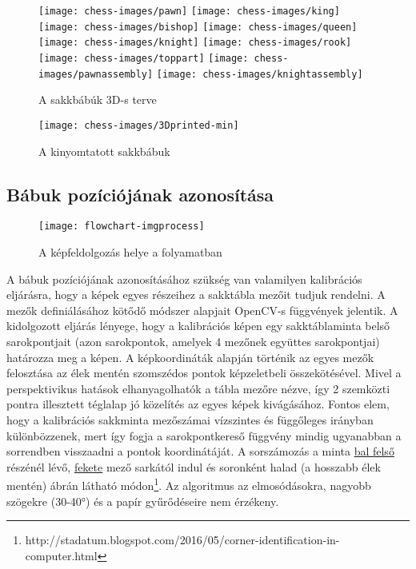 \documentclass[../documentation.tex]{subfiles}
\begin{document}
\begin{figure}[h]
\centering
\texttt{[image: chess-images/pawn]}
\texttt{[image: chess-images/king]}
\texttt{[image: chess-images/bishop]}
\texttt{[image: chess-images/queen]}
\texttt{[image: chess-images/knight]}
\texttt{[image: chess-images/rook]}
\texttt{[image: chess-images/toppart]}
\texttt{[image: chess-images/pawnassembly]}
\texttt{[image: chess-images/knightassembly]}
\caption{A sakkbábúk 3D-s terve}
\label{fig:chesspieces}
\end{figure}

\begin{figure}[h]
\centering
\texttt{[image: chess-images/3Dprinted-min]}
\caption{A kinyomtatott sakkbábuk}
\label{fig:3dprinted}
\end{figure}

\subsection{Bábuk pozíciójának azonosítása}

\begin{figure}[h]
\centering
\texttt{[image: flowchart-imgprocess]}
\caption{A képfeldolgozás helye a folyamatban}
\label{fig:flowchart-imgprocess}
\end{figure}

A bábuk pozíciójának azonosításához szükség van valamilyen kalibrációs eljárásra, hogy a képek egyes részeihez a sakktábla mezőit tudjuk rendelni. A mezők definiálásához kötődő módszer alapjait OpenCV-s függvények jelentik. A kidolgozott eljárás lényege, hogy a kalibrációs képen egy sakktáblaminta belső sarokpontjait (azon sarokpontok, amelyek 4 mezőnek együttes sarokpontjai) határozza meg a képen. A képkoordináták alapján történik az egyes mezők felosztása az élek mentén szomszédos pontok képzeletbeli összekötésével. Mivel a perspektivikus hatások elhanyagolhatók a tábla mezőre nézve, így 2 szemközti pontra illesztett téglalap jó közelítés az egyes képek kivágásához. Fontos elem, hogy a kalibrációs sakkminta mezőszámai vízszintes és függőleges irányban különbözzenek, mert így fogja a sarokpontkereső függvény mindig ugyanabban a sorrendben visszaadni a pontok koordinátáját. A sorszámozás a minta \underline{bal felső} részénél lévő, \underline{fekete} mező sarkától indul és soronként halad (a hosszabb élek mentén)  ábrán látható módon\footnote{http://stadatum.blogspot.com/2016/05/corner-identification-in-computer.html}. Az algoritmus az elmosódásokra, nagyobb szögekre (30-40°) és a papír gyűrődéseire nem érzékeny.
\end{document}
